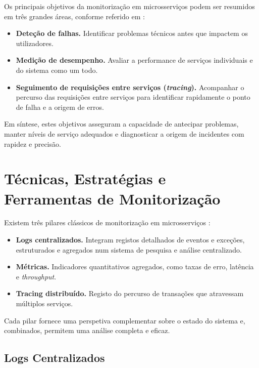 Os principais objetivos da monitorização em microsserviços podem ser resumidos em três grandes áreas, conforme referido em \cite{Richardson2018}:

\begin{itemize}
    \item \textbf{Deteção de falhas.} Identificar problemas técnicos antes que impactem os utilizadores.
    
    \item \textbf{Medição de desempenho.} Avaliar a performance de serviços individuais e do sistema como um todo.
    
    \item \textbf{Seguimento de requisições entre serviços (\textit{tracing}).} Acompanhar o percurso das requisições entre serviços para identificar rapidamente o ponto de falha e a origem de erros.
\end{itemize}

Em síntese, estes objetivos asseguram a capacidade de antecipar problemas, manter níveis de serviço adequados e diagnosticar a origem de incidentes com rapidez e precisão.


\section{Técnicas, Estratégias e Ferramentas de Monitorização}

Existem três pilares clássicos de monitorização em microsserviços \cite{Soldani2018}:

\begin{itemize}
    \item \textbf{Logs centralizados.} Integram registos detalhados de eventos e exceções, estruturados e agregados num sistema de pesquisa e análise centralizado.
    \item \textbf{Métricas.} Indicadores quantitativos agregados, como taxas de erro, latência e \textit{throughput}.
    \item \textbf{Tracing distribuído.} Registo do percurso de transações que atravessam múltiplos serviços.
\end{itemize}

Cada pilar fornece uma perspetiva complementar sobre o estado do sistema e, combinados, permitem uma análise completa e eficaz.

\subsection{Logs Centralizados}

